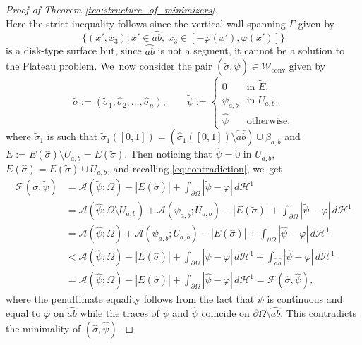 \documentclass[JEP,XML,SOM,Unicode, NoFloatCountersInSection,published]{cedram}
\let\arc\wideparen
\let\Om\Omega
\newcommand\admclassconv{{\mathcal W_\mathrm{conv}}}
\theoremstyle{definition}
\begin{document}
\begin{proof}[Proof of Theorem \ref{teo:structure_of_minimizers}]
\begin{equation}
\end{equation}
Here the strict inequality follows since the vertical wall spanning $\Gamma$ given by
\[
\{(x',x_3)\colon x'\in\arc{ab},\ x_3\in[-\varphi(x'),\varphi(x')]\}
\]
is a disk-type surface but, since $\arc{ab}$ is not a segment, it cannot be a solution to the Plateau problem. We~now consider the pair $(\widetilde\sigma,\widetilde\psi)\in\admclassconv$ given by
\begin{equation}\label{def:sigma,psi}
\widetilde\sigma:=(\widetilde\sigma_1,\widehat\sigma_2,\dots,\widehat\sigma_n),\qquad
\widetilde\psi:=\begin{cases}
0&\text{in }\widetilde E,\\
\psi_{a,b}&\text{in }U_{a,b},\\
\widehat \psi&\text{otherwise},
\end{cases}
\end{equation}
where $\widetilde\sigma_1$ is such that $\widetilde\sigma_1([0,1])=(\widehat\sigma_1([0,1])\setminus\arc{ab})\cup\beta_{a,b}$ and $\widetilde{E}:= E(\widehat\sigma)\setminus U_{a,b}=E(\widetilde\sigma)$.
Then noticing that $\widehat\psi=0$ in $U_{a,b}$, $E(\widehat\sigma)=E(\widetilde\sigma)\cup U_{a,b}$, and recalling \eqref{eq:contradiction}, we~get
\begin{equation*}
\begin{split}
{\mathcal F}(\widetilde\sigma,\widetilde\psi)&=\mathcal{A}(\widetilde\psi;\Om)-|E(\widetilde\sigma)|+\int_{\partial\Om}|\widetilde\psi-\varphi|\,d\mathcal{H}^1\\
&=\mathcal{A}(\widehat\psi;\Om\setminus U_{a,b})+\mathcal{A}(\psi_{a,b};U_{a,b})-|E(\widetilde\sigma)|+\int_{\partial\Om}|\widetilde\psi-\varphi|\,d\mathcal{H}^1\\
&=\mathcal{A}(\widehat\psi;\Om)+\mathcal{A}(\psi_{a,b};U_{a,b})-|E(\widehat\sigma)|+\int_{\partial\Om}|\widehat\psi-\varphi|\,d\mathcal{H}^1\\
&<\mathcal{A}(\widehat\psi;\Om)-|E(\widehat\sigma)|+\int_{\partial\Om}|\widetilde\psi-\varphi|\,d\mathcal{H}^1+\int_{\arc{ab}}|\widehat\psi-\varphi|\,d\mathcal{H}^1\\
&=\mathcal{A}(\widehat\psi;\Om)-|E(\widehat\sigma)|+\int_{\partial\Om}|\widehat\psi-\varphi|\,d\mathcal{H}^1= {\mathcal F}(\widehat\sigma,\widehat\psi),
\end{split}
\end{equation*}
where the penultimate equality follows from the fact that $\widetilde\psi$ is continuous and equal to $\varphi$ on $\arc{ab}$ while the traces of $\widetilde\psi$ and $\widehat\psi$ coincide on $\partial\Om\setminus\arc{ab}$.
This contradicts the minimality of $(\widehat\sigma,\widehat\psi)$.


\end{proof}
\end{document}
